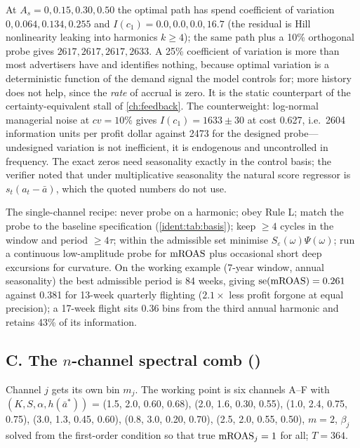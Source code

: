 At $A_s = 0, 0.15, 0.30, 0.50$ the optimal path has spend coefficient of variation $0, 0.064, 0.134, 0.255$ and $I(c_1) = 0.0, 0.0, 0.0, 16.7$ (the residual is Hill nonlinearity leaking into harmonics $k \ge 4$); the same path plus a 10\% orthogonal probe gives $2617, 2617, 2617, 2633$. A 25\% coefficient of variation is more than most advertisers have and identifies nothing, because optimal variation is a deterministic function of the demand signal the model controls for; more history does not help, since the \emph{rate} of accrual is zero. It is the static counterpart of the certainty-equivalent stall of \cref{ch:feedback}. The counterweight: log-normal managerial noise at $cv = 10\%$ gives $I(c_1) = 1633 \pm 30$ at cost 0.627, i.e.\ 2604 information units per profit dollar against 2473 for the designed probe---undesigned variation is not inefficient, it is endogenous and uncontrolled in frequency. The exact zeros need seasonality exactly in the control basis; the verifier noted that under multiplicative seasonality the natural score regressor is $s_t(a_t - \bar a)$, which the quoted numbers do not use.

The single-channel recipe: never probe on a harmonic; obey Rule L; match the probe to the baseline specification (\cref{ident:tab:basis}); keep $\ge 4$ cycles in the window and period $\ge 4\tau$; within the admissible set minimise $S_\varepsilon(\omega)\Psi(\omega)$; run a continuous low-amplitude probe for $\mathrm{mROAS}$ plus occasional short deep excursions for curvature. On the working example (7-year window, annual seasonality) the best admissible period is 84 weeks, giving $\mathrm{se}(\mathrm{mROAS}) = 0.261$ against 0.381 for 13-week quarterly flighting ($2.1\times$ less profit forgone at equal precision); a 17-week flight sits 0.36 bins from the third annual harmonic and retains 43\% of its information.

\subsection{C. The $n$-channel spectral comb ()}

Channel $j$ gets its own bin $m_j$. The working point is six channels A--F with $(K, S, \alpha, h(\bar a^*))$ = (1.5, 2.0, 0.60, 0.68), (2.0, 1.6, 0.30, 0.55), (1.0, 2.4, 0.75, 0.75), (3.0, 1.3, 0.45, 0.60), (0.8, 3.0, 0.20, 0.70), (2.5, 2.0, 0.55, 0.50), $m = 2$, $\beta_j$ solved from the first-order condition so that true $\mathrm{mROAS}_j = 1$ for all; $T = 364$.

